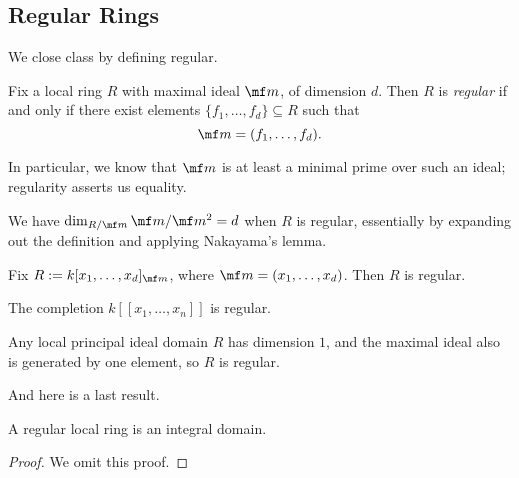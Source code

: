 \subsection{Regular Rings}
We close class by defining regular.
\begin{definition}[Regular]
	Fix a local ring $R$ with maximal ideal $\mf m$, of dimension $d$. Then $R$ is \textit{regular} if and only if there exist elements $\{f_1,\ldots,f_d\}\subseteq R$ such that
	\[\mf m=(f_1,\ldots,f_d).\]
\end{definition}
In particular, we know that $\mf m$ is at least a minimal prime over such an ideal; regularity asserts us equality.
\begin{remark}
	We have $\dim_{R/\mf m}\mf m/\mf m^2=d$ when $R$ is regular, essentially by expanding out the definition and applying Nakayama's lemma.
\end{remark}
\begin{example}
	Fix $R:=k[x_1,\ldots,x_d]_{\mf m}$, where $\mf m=(x_1,\ldots,x_d)$. Then $R$ is regular.
\end{example}
\begin{example}
	The completion $k[[x_1,\ldots,x_n]]$ is regular.
\end{example}
\begin{example}
	Any local principal ideal domain $R$ has dimension $1$, and the maximal ideal also is generated by one element, so $R$ is regular.
\end{example}
And here is a last result.
\begin{proposition}
	A regular local ring is an integral domain.
\end{proposition}
\begin{proof}
	We omit this proof.
\end{proof}